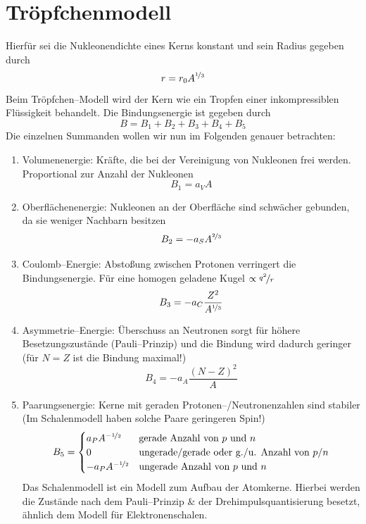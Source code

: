 \documentclass[Ex4_Zusammenfassung.tex]{subfiles}
\begin{document}
\section{Tröpfchenmodell}
Hierfür sei die Nukleonendichte eines Kerns konstant und sein Radius gegeben durch
\begin{equation}
	r = r_0 A^{\nicefrac{1}{3}}
\end{equation}
Beim Tröpfchen--Modell wird der Kern wie ein Tropfen einer inkompressiblen Flüssigkeit behandelt. Die Bindungsenergie ist gegeben durch
\begin{equation}
	B = B_1 + B_2 + B_3 + B_4 + B_5
\end{equation}
Die einzelnen Summanden wollen wir nun im Folgenden genauer betrachten:
\begin{enumerate}
	\item Volumenenergie: Kräfte, die bei der Vereinigung von Nukleonen frei werden. Proportional zur Anzahl der Nukleonen
		\begin{equation}
			B_1 = a_V A
		\end{equation}
	
	\item Oberflächenenergie: Nukleonen an der Oberfläche sind schwächer gebunden, da sie weniger Nachbarn besitzen
		\begin{equation}
			B_2 = -a_S A^{\nicefrac{2}{3}}
		\end{equation}
	
	\item Coulomb--Energie: Abstoßung zwischen Protonen verringert die Bindungsenergie. Für eine homogen geladene Kugel $\propto \nicefrac{q^2}{r}$
		\begin{equation}
			B_3 = - a_C \frac{Z^2}{A^{\nicefrac{1}{3}}}
		\end{equation}
		
	\item Asymmetrie--Energie: Überschuss an Neutronen sorgt für höhere Besetzungszustände (Pauli--Prinzip) und die Bindung wird dadurch geringer (für $N=Z$ ist die Bindung maximal!)
		\begin{equation}
			B_4 = - a_A \frac{(N-Z)^2}{A}
		\end{equation}
		
	\item Paarungsenergie: Kerne mit geraden Protonen--/Neutronenzahlen sind stabiler (Im Schalenmodell haben solche Paare geringeren Spin!) 
		\begin{equation}
			B_5 = 
				\begin{cases}
					a_P A^{-\nicefrac{1}{2}} & \text{gerade Anzahl von $p$ und $n$}\\
					0 									   & \text{ungerade/gerade oder g./u. Anzahl von $p$/$n$}\\
					- a_P A^{-\nicefrac{1}{2}} & \text{ungerade Anzahl von $p$ und $n$}
				\end{cases}
		\end{equation}
	Das Schalenmodell ist ein Modell zum Aufbau der Atomkerne. Hierbei werden die Zustände nach dem Pauli--Prinzip \& der Drehimpulsquantisierung besetzt, ähnlich dem Modell für Elektronenschalen.
	 

\end{enumerate}
\end{document}
